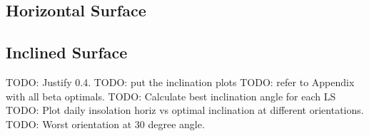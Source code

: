 \subsection{Horizontal Surface}



\subsection{Inclined Surface}
TODO: Justify 0.4.
TODO: put the inclination plots
TODO: refer to Appendix with all beta optimals.
TODO: Calculate best inclination angle for each LS
TODO: Plot daily insolation horiz vs optimal inclination at different orientations.
TODO: Worst orientation at 30 degree angle.

